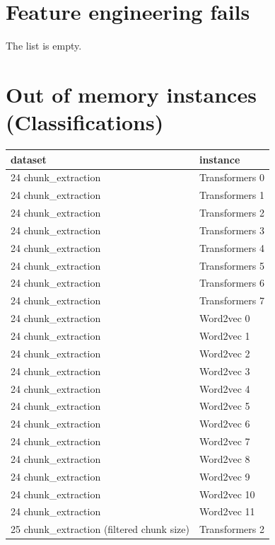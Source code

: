 \section{Feature engineering fails}

\label{sec:annexe:feature_engineering_fails}

The list is empty.

\section{Out of memory instances (Classifications)}

\label{sec:annexe:out_of_memory_instances_classifications}

\begin{table}[ht]
\centering
\begin{tabular}{ll}
\hline
dataset & instance \\ 
\hline
24 chunk\_extraction & Transformers 0 \\ 
24 chunk\_extraction & Transformers 1 \\ 
24 chunk\_extraction & Transformers 2 \\ 
24 chunk\_extraction & Transformers 3 \\ 
24 chunk\_extraction & Transformers 4 \\ 
24 chunk\_extraction & Transformers 5 \\ 
24 chunk\_extraction & Transformers 6 \\ 
24 chunk\_extraction & Transformers 7 \\ 
24 chunk\_extraction & Word2vec 0 \\ 
24 chunk\_extraction & Word2vec 1 \\ 
24 chunk\_extraction & Word2vec 2 \\ 
24 chunk\_extraction & Word2vec 3 \\ 
24 chunk\_extraction & Word2vec 4 \\ 
24 chunk\_extraction & Word2vec 5 \\ 
24 chunk\_extraction & Word2vec 6 \\ 
24 chunk\_extraction & Word2vec 7 \\ 
24 chunk\_extraction & Word2vec 8 \\ 
24 chunk\_extraction & Word2vec 9 \\ 
24 chunk\_extraction & Word2vec 10 \\ 
24 chunk\_extraction & Word2vec 11 \\ 
25 chunk\_extraction (filtered chunk size) & Transformers 2 \\ 

\end{tabular}
\end{table}
